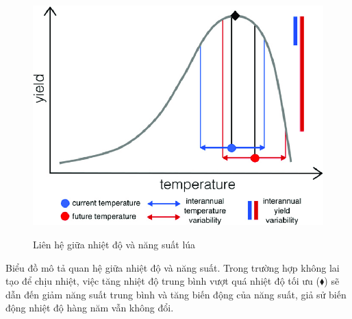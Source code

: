 \documentclass[12pt]{report}
\begin{document}
\begin{flushleft}
	\begin{figure}[H]
		\centering
		\caption{Liên hệ giữa nhiệt độ và năng suất lúa}
		\includegraphics[width = \textwidth]{images/sodonhietdo.png}
		\label{fig:image}
	\end{figure}

	Biểu đồ mô tả quan hệ giữa nhiệt độ và năng suất. Trong trường hợp không lai tạo để chịu nhiệt, việc tăng nhiệt độ trung bình vượt quá nhiệt độ tối ưu (${\blacklozenge}$) sẽ dẫn đến giảm năng suất trung bình và tăng biến động của năng suất, giả sử biến động nhiệt độ hàng năm vẫn không đổi.
\end{flushleft}

\newpage
\end{document}
